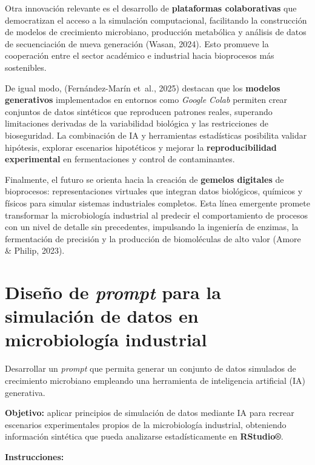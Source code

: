 \documentclass[
  spanish,
  letterpaper,
  DIV=11,
  numbers=noendperiod]{scrreprt}
\begin{document}
Otra innovación relevante es el desarrollo de \textbf{plataformas
colaborativas} que democratizan el acceso a la simulación computacional,
facilitando la construcción de modelos de crecimiento microbiano,
producción metabólica y análisis de datos de secuenciación de nueva
generación (Wasan, 2024). Esto promueve la cooperación entre el sector
académico e industrial hacia bioprocesos más sostenibles.

De igual modo, (Fernández-Marín et~al., 2025) destacan que los
\textbf{modelos generativos} implementados en entornos como \emph{Google
Colab} permiten crear conjuntos de datos sintéticos que reproducen
patrones reales, superando limitaciones derivadas de la variabilidad
biológica y las restricciones de bioseguridad. La combinación de IA y
herramientas estadísticas posibilita validar hipótesis, explorar
escenarios hipotéticos y mejorar la \textbf{reproducibilidad
experimental} en fermentaciones y control de contaminantes.

Finalmente, el futuro se orienta hacia la creación de \textbf{gemelos
digitales} de bioprocesos: representaciones virtuales que integran datos
biológicos, químicos y físicos para simular sistemas industriales
completos. Esta línea emergente promete transformar la microbiología
industrial al predecir el comportamiento de procesos con un nivel de
detalle sin precedentes, impulsando la ingeniería de enzimas, la
fermentación de precisión y la producción de biomoléculas de alto valor
(Amore \& Philip, 2023).

\section{\texorpdfstring{Diseño de \emph{prompt} para la simulación de
datos en microbiología
industrial}{Diseño de prompt para la simulación de datos en microbiología industrial}}\label{diseuxf1o-de-prompt-para-la-simulaciuxf3n-de-datos-en-microbiologuxeda-industrial}

Desarrollar un \emph{prompt} que permita generar un conjunto de datos
simulados de crecimiento microbiano empleando una herramienta de
inteligencia artificial (IA) generativa.

\textbf{Objetivo:} aplicar principios de simulación de datos mediante IA
para recrear escenarios experimentales propios de la microbiología
industrial, obteniendo información sintética que pueda analizarse
estadísticamente en \textbf{RStudio®}.

\textbf{Instrucciones:}
\end{document}
